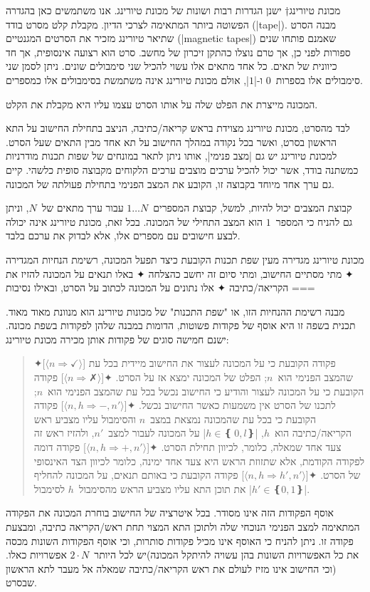 מכונת טיורינג†{%
  ישנן הגדרות רבות ושונות של מכונת טיורינג. אנו משתמשים כאן בהגדרה הפשוטה ביותר
  המתאימה לצרכי הדיון.
}
מקבלת קלט מסרט בודד (\E|tape|). מבנה הסרט שתיאר טיורינג מזכיר את הסרטים
המגנטיים (\E|magnetic tapes|) שאמנם פותחו שנים ספורות לפני כן, אך טרם נוצלו
כהתקן זיכרון של מחשב. סרט הוא רצועה אינסופית, אך חד כיוונית של תאים. כל אחד
מתאים אלו עשוי להכיל שני סימבולים שונים. ניתן לסמן שני סימבולים אלו
בספרות~$0$ ו-\E|$1$|, אולם מכונת טיורינג אינה משתמשת בסימבולים אלו כמספרים.

המכונה מייצרת את הפלט שלה על אותו הסרט עצמו עליו היא מקבלת את הקלט.

לבד מהסרט, מכונת טיורינג מצוידת בראש קריאה/כתיבה, הניצב בתחילת החישוב על התא
הראשון בסרט, ואשר בכל נקודה במהלך החישוב על תא אחד מבין התאים שעל הסרט. למכונת
טיורינג יש גם \ע|מצב פנימי|, אותו ניתן לתאר במונחים של שפות תכנות מודרניות
כמשתנה בודד, אשר יכול להכיל ערכים מוצבים ערכים הלקוחים מקבוצה סופית כלשהי. קיים
גם ערך אחד מיוחד בקבוצה זו, הקובע את המצב הפנימי בתחילת פעולתה של המכונה.

קבוצת המצבים יכול להיות, למשל, קבוצת המספרים~$1…N$ עבור ערך מתאים של~$N$, וניתן
גם להניח כי המספר~$1$ הוא המצב התחילי של המכונה. בכל זאת, מכונת טיורינג אינה
יכולה לבצע חישובים עם מספרים אלו, אלא לבדוק את ערכם בלבד.

מכונת טיורינג מגדירה מעין שפת תכנות הקובעת כיצד תפעל המכונה, רשימת הנחיות המגדירה
✦ מתי מסתיים החישוב, ומתי סיום זה יחשב כהצלחה
✦ באלו תנאים על המכונה להזיז את הקריאה/כתיבה
✦ אלו נתונים על המכונה לכתוב על הסרט, ובאילו נסיבות
===

מבנה רשימת ההנחיות הזו, או "שפת התכנות" של מכונות טיורינג הוא מנוונת מאוד מאוד.
תכנית בשפה זו היא אוסף של פקודות פשוטות, הדומות במבנה שלהן לפקודות בשפת מכונה.
ישנם חמישה סוגים של פקודות אותן מכירה מכונת טיורינג:

\begin{quote}
\begin{enumerate}
  ✦[$⟨n⇒✓⟩$] פקודה הקובעת כי על המכונה לעצור את החישוב מיידית בכל עת שהמצב
  הפנימי הוא~$n$; הפלט של המכונה ימצא אז על הסרט.
  ✦[$⟨n⇒ ✗⟩$] פקודה הקובעת כי על המכונה לעצור והודיע כי החישוב נכשל בכל עת
    שהמצב הפנימי הוא~$n$; לתכנו של הסרט אין משמעות כאשר החישוב נכשל.
  ✦[$⟨n, h⇒-, n'⟩$] פקודה הקובעת כי בכל עת שהמכונה נמצאת במצב~$n$
    והסימבול עליו מצביע ראש הקריאה/כתיבה הוא~$h$, \E|$h∈❴~0,l❵$| על המכונה
    לעבור למצב~$n'$, ולהזיז ראש זה צעד אחד שמאלה, כלומר, לכיוון תחילת הסרט.
  ✦[$⟨n,h⇒+, n'⟩$] פקודה דומה לפקודה הקודמת, אלא שתזוזת הראש היא
    צעד אחד ימינה, כלומר לכיוון הצד האינסופי של הסרט.
  ✦[$⟨n,h⇒ h', n'⟩$] פקודה הקובעת כי באותם תנאים, על המכונה להחליף את תוכן התא
  עליו מצביע הראש מהסימבול~$h$ לסימבול \E|$h'∈❴0,1❵$|.
\end{enumerate}
\end{quote}
אוסף הפקודות הזה אינו מסודר. בכל איטרציה של החישוב בוחרת המכונה את הפקודה
המתאימה למצב הפנימי הנוכחי שלה ולתוכן התא המצוי תחת ראש/הקריאה כתיבה, ומבצעת
פקודה זו. ניתן להניח כי האוסף אינו מכיל פקודות סותרות, וכי אוסף הפקודות השונות
מכסה את כל האפשרויות השונות בהן עשויה להיתקל המכונה)יש לכל היותר~$2·N$
אפשרויות כאלו.(וכי החישוב אינו מזיז לעולם את ראש הקריאה/כתיבה שמאלה אל מעבר
לתא הראשון שבסרט.

